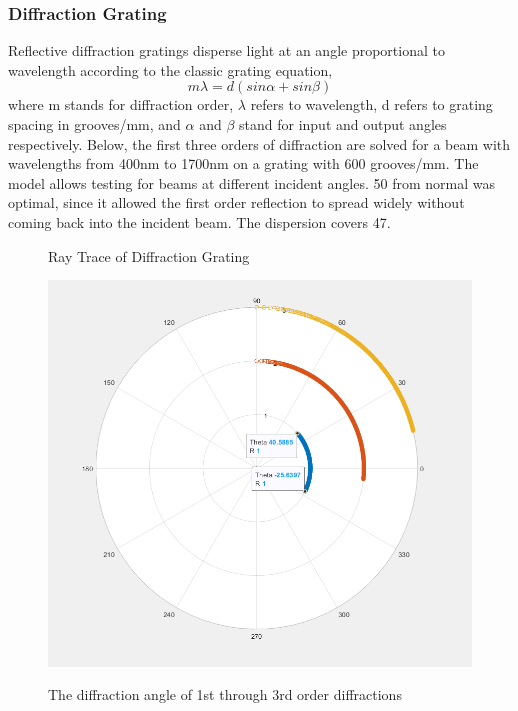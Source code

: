 \documentclass[journal]{IEEEtran}
\begin{document}
\subsubsection{Diffraction Grating}
Reflective diffraction gratings disperse light at an angle proportional to wavelength according to the classic grating equation,
\begin{equation}
    m\lambda = d(sin\alpha + sin\beta)
\end{equation}
where m stands for diffraction order, $\lambda$ refers to wavelength, d refers to grating spacing in grooves/mm, and $\alpha$ and $\beta$ stand for input and output angles respectively. Below, the first three orders of diffraction are solved for a beam with wavelengths from 400nm to 1700nm on a grating with 600 grooves/mm. The model allows testing for beams at different incident angles. 50\textdegree \: from normal was optimal, since it allowed the first order reflection to spread widely without coming back into the incident beam. The dispersion covers 47\textdegree.
\begin{figure}[H]
    \caption{Ray Trace of Diffraction Grating}
    \centering
    \includegraphics[width=\linewidth]{images/DiffractionAngleCalculator.png}
    \label{fig:diffraction-angle}
    \caption{The diffraction angle of 1st through 3rd order diffractions}
\end{figure}
\end{document}
